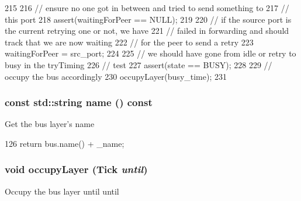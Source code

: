 \begin{DoxyCode}
215 {
216     // ensure no one got in between and tried to send something to
217     // this port
218     assert(waitingForPeer == NULL);
219 
220     // if the source port is the current retrying one or not, we have
221     // failed in forwarding and should track that we are now waiting
222     // for the peer to send a retry
223     waitingForPeer = src_port;
224 
225     // we should have gone from idle or retry to busy in the tryTiming
226     // test
227     assert(state == BUSY);
228 
229     // occupy the bus accordingly
230     occupyLayer(busy_time);
231 }
\end{DoxyCode}
\hypertarget{classBaseBus_1_1Layer_a6490f765a824ced1cc94979609fe7e07}{
\subsubsection[{name}]{\setlength{\rightskip}{0pt plus 5cm}const std::string name () const}}
\label{classBaseBus_1_1Layer_a6490f765a824ced1cc94979609fe7e07}
Get the bus layer's name 


\begin{DoxyCode}
126 { return bus.name() + _name; }
\end{DoxyCode}
\hypertarget{classBaseBus_1_1Layer_aa31a4364e1cce5c7aee0703fa8e289eb}{
\subsubsection[{occupyLayer}]{\setlength{\rightskip}{0pt plus 5cm}void occupyLayer ({\bf Tick} {\em until})}}
\label{classBaseBus_1_1Layer_aa31a4364e1cce5c7aee0703fa8e289eb}
Occupy the bus layer until until 


